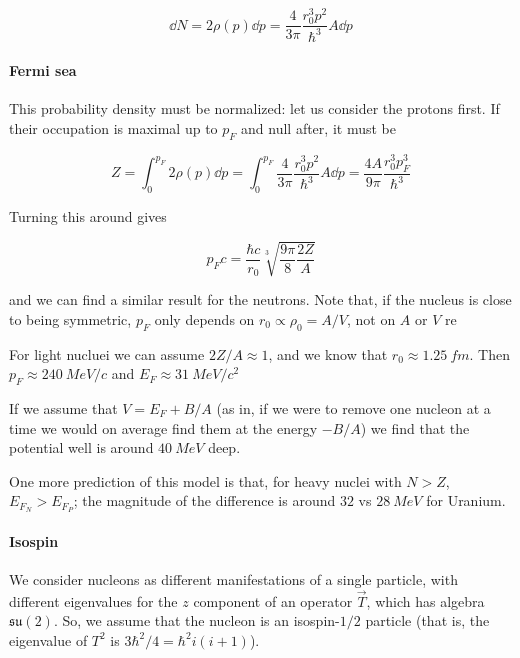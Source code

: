 \documentclass[main.tex]{subfiles}
\begin{document}
\begin{equation} \label{eq:fermi-state-density}
    \dd{N} = 2 \rho(p) \dd{p} = \frac{4}{3 \pi} \frac{r_0^3 p^2}{\hbar^3} A \dd{p}
\end{equation}

\paragraph{Fermi sea}

This probability density must be normalized: let us consider the protons first. If their occupation is maximal up to \(p_F\) and null after, it must be

\begin{equation}
    Z
    = \int _{0}  ^{p_F} 2 \rho( p)  \dd{p}
    = \int _{0}  ^{p_F} \frac{4}{3 \pi} \frac{r_0^3 p^2}{\hbar^3} A \dd{p}
    = \frac{4 A}{9 \pi} \frac{r_0^3 p_F^3}{\hbar^3}
\end{equation}

Turning this around gives

\begin{equation} \label{eq:fermi-sea-momentum-protons}
    p_F c = \frac{\hbar c}{r_0} \sqrt[3]{\frac{9 \pi }{8} \frac{2Z}{A}}
\end{equation}

and we can find a similar result for the neutrons.
Note that, if the nucleus is close to being symmetric, \(p_F\) only depends on \(r_0 \propto \rho_0 = A/V\), not on \(A\) or \(V\) re

For light nucluei we can assume \(2Z/A \approx 1\), and we know that \(r_0 \approx \SI{1.25}{fm} \). Then \(p_F \approx \SI{240}{MeV/c} \) and \(E_F \approx \SI{31}{MeV/c^2} \)

If we assume that \(V = E_F + B/A\) (as in, if we were to remove one nucleon at a time we would on average find them at the energy \(-B/A\)) we find that the potential well is around \(\SI{40}{MeV}\) deep.

One more prediction of this model is that, for heavy nuclei with \(N>Z\), \(E_{F_N} > E_{F_P}\); the magnitude of the difference is around \(32\) vs \(\SI{28}{MeV} \) for Uranium.

\paragraph{Isospin}

We consider nucleons as different manifestations of a single particle, with different eigenvalues for the \(z\) component of an operator \(\vec{T} \), which has algebra \(\mathfrak{su}(2)\). So, we assume that the nucleon is an isospin-\(1/2\) particle (that is, the eigenvalue of \(T^2\) is \(3\hbar^2 /4 = \hbar^2 i (i+1)\)).
\end{document}
